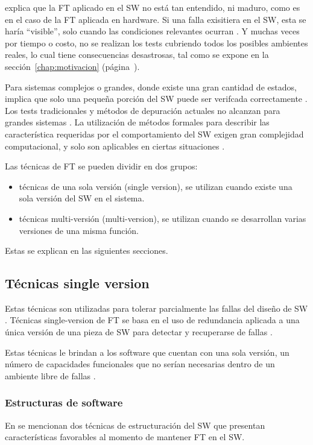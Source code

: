 \cite{FTDesign} explica que la \ac{FT} aplicado en el \ac{SW} no está tan entendido, ni maduro, 
como es en el caso de la \ac{FT} aplicada en hardware. Si una falla exisitiera en el \ac{SW}, esta 
se haría ``visible'', solo cuando las condiciones relevantes ocurran \citep{FTDesign}. Y muchas 
veces por tiempo o costo, no se realizan los tests cubriendo todos los posibles ambientes reales, 
lo cual tiene consecuencias desastrosas, tal como se expone en la sección~\ref{chap:motivacion} 
(página~\pageref{chap:motivacion}).

Para sistemas complejos o grandes, donde existe una gran cantidad de estados, implica que solo una 
pequeña porción del \ac{SW} puede ser verifcada correctamente \citep{FTDesign}. Los tests 
tradicionales y métodos de depuración actuales no alcanzan para grandes sistemas \citep{FTDesign}. 
La utilización de métodos formales para describir las característica requeridas por el 
comportamiento del \ac{SW} exigen gran complejidad computacional, y solo son aplicables en 
ciertas situaciones \citep{FTDesign}.

Las técnicas de \ac{FT} se pueden dividir en dos grupos:
\begin{itemize}
 \item técnicas de una sola versión (single version), se utilizan cuando existe una sola versión del \ac{SW} en el 
sistema.
 \item técnicas multi-versión (multi-version), se utilizan cuando se desarrollan varias versiones de una misma 
función. 
\end{itemize}

Estas se explican en las siguientes secciones.

\subsection{Técnicas single version}
Estas técnicas son utilizadas para tolerar parcialmente las fallas del diseño de \ac{SW} 
\citep{Pullum01}. Técnicas single-version de \ac{FT} se basa en el uso de redundancia aplicada a 
una única versión de una pieza de \ac{SW} para detectar y recuperarse de fallas 
\citep{SoftwareFaultToleranceATutorial}. 

Estas técnicas le brindan a los software que cuentan con una sola versión, un número de capacidades funcionales 
que no serían necesarias dentro de un ambiente libre de fallas \citep{FTDesign}. 

\subsubsection{Estructuras de software}
En \cite{SoftwareFaultToleranceATutorial} se mencionan dos técnicas de estructuración del \ac{SW}
que presentan características favorables al momento de mantener \ac{FT} en el \ac{SW}.

